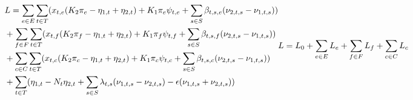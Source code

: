 	\begin{subequations}\label{eqn:lagrangian_2}
		\begin{align}
			&L = \sum_{e \in E}\sum_{t \in T}(x_{t,e}(K_2\pi_e-\eta_{1,t}+\eta_{2,t}) + K_1\pi_e\psi_{t,e} + \sum_{s \in S}\beta_{t,s,e}(\nu_{2,t,s} - \nu_{1,t,s})) \notag \\
			&+ \sum_{f \in F}\sum_{t \in T}(x_{t,f}(K_2\pi_f-\eta_{1,t}+\eta_{2,t}) + K_1\pi_f\psi_{t,f} + \sum_{s \in S}\beta_{t,s,f}(\nu_{2,t,s}-\nu_{1,t,s})) \notag \\
			&+ \sum_{c \in C}\sum_{t \in T}(x_{t,c}(K_2\pi_c-\eta_{1,t}+\eta_{2,t}) + K_1\pi_c\psi_{t,c} + \sum_{s \in S}\beta_{t,s,c}(\nu_{2,t,s}-\nu_{1,t,s})) \notag \\
			&+\sum_{t \in T}(\eta_{1,t} - N_t\eta_{2,t} + \sum_{s \in S}\lambda_{t,s}(\nu_{1,t,s}-\nu_{2,t,s}) -\epsilon(\nu_{1,t,s}+\nu_{2,t,s}))
		\end{align}
		\begin{align}
			&L = L_0 + \sum_{e \in E}L_e + \sum_{f \in F}L_f + \sum_{c \in C}L_c
		\end{align}
	\end{subequations}

